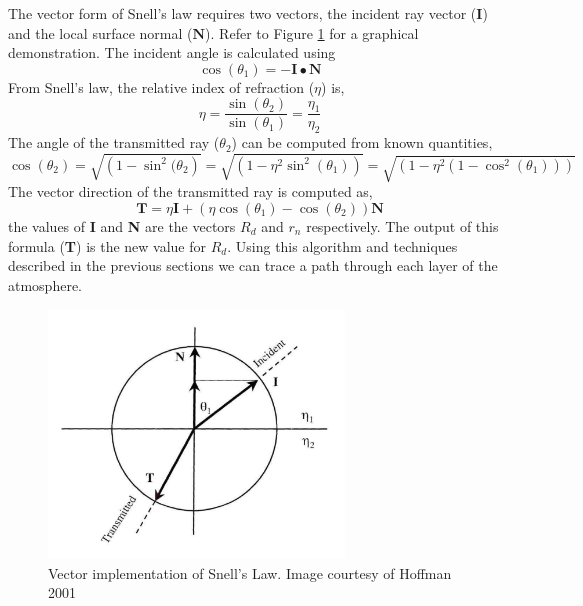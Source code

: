 The vector form of Snell's law requires two vectors, the incident ray vector ($\textbf{I}$) and the local surface normal ($\textbf{N}$). Refer to Figure \ref{fig:incident} for a graphical demonstration. The incident angle is calculated using
\begin{equation}
\cos (\theta_1) = -\textbf{I} \bullet \textbf{N}
\end{equation}
From Snell's law, the relative index of refraction ($\eta$) is,
\begin{equation}
\eta = \frac{\sin (\theta_2)}{\sin(\theta_1)} = \frac{\eta_1}{\eta_2}
\end{equation}
The angle of the transmitted ray ($\theta_2$) can be computed from known quantities,
\begin{equation}
\cos(\theta_2) = \sqrt{\left(1-\sin^2(\theta_2\right)}= \sqrt{\left(1-\eta^2\sin^2(\theta_1)\right)} =  \sqrt{\left(1-\eta^2(1-\cos^2(\theta_1))\right)}
\end{equation}
The vector direction of the transmitted ray is computed as,
\begin{equation}
\textbf{T} = \eta\textbf{I} + (\eta\cos(\theta_1) -\cos (\theta_2))\textbf{N}
\end{equation}
the values of \textbf{I} and \textbf{N} are the vectors $R_d$ and $r_n$ respectively. The output of this formula (\textbf{T}) is the new value for $R_d$. Using this algorithm and techniques described in the previous sections we can trace a path through each layer of the atmosphere.

\begin{figure}[!p]
    \centering
	\includegraphics[width=0.7\textwidth]{./rtm/incident.png}
	\caption{Vector implementation of Snell's Law. Image courtesy of Hoffman 2001 \cite{Hoffman-thesis}}
		\label{fig:incident}
\end{figure}
\clearpage

